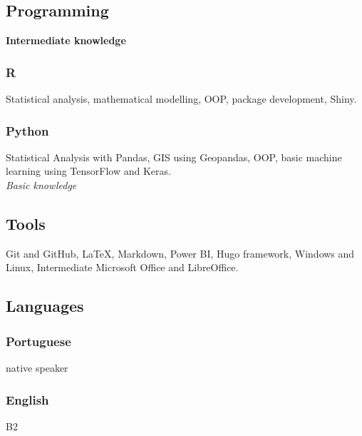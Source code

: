 \documentclass[11pt,oneside,a4paper,titlepage]{article}
\begin{document}
\subsection{  Programming}
\vspace{-2mm}
\textcolor{textGrey}{\textbf{Intermediate knowledge}}
\subsubsection{R}
Statistical analysis, mathematical modelling, OOP, package development, Shiny.
\subsubsection{Python}
Statistical Analysis with Pandas, GIS using Geopandas, OOP, basic machine learning using TensorFlow and Keras.
\\[2mm]
\textcolor{textGrey}{\textit{Basic knowledge}}\\


\vspace{-2mm}
\subsection{  Tools}
\vspace{-2mm}
 \quad Git and GitHub, \LaTeX, Markdown, Power BI, Hugo framework, Windows and Linux, Intermediate Microsoft Office and LibreOffice.

\vspace{-2mm}
\subsection{  Languages}
\vspace{-2mm}
\subsubsection{Portuguese}
native speaker
\subsubsection{English}
B2

\vspace{-3mm}
\end{document}
